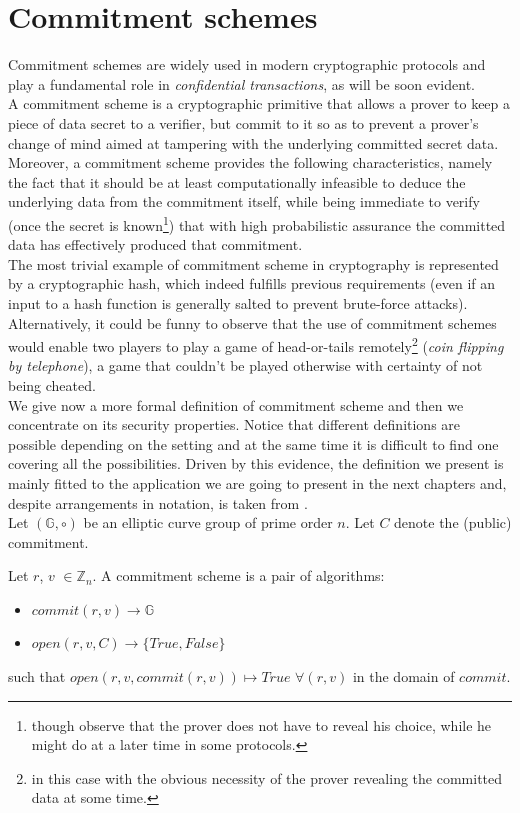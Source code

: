 \section{Commitment schemes}
Commitment schemes are widely used in modern cryptographic protocols and play a fundamental role in \textit{confidential transactions}, as will be soon evident.\\
A commitment scheme is a cryptographic primitive that allows a prover to keep a piece of data secret to a verifier, but commit to it so as to prevent a prover's change of mind aimed at tampering with the underlying committed secret data. Moreover, a commitment scheme provides the following characteristics, namely the fact that it should be at least computationally infeasible to deduce the underlying data from the commitment itself, while being immediate to verify (once the secret is known\footnote{though observe that the prover does not have to reveal his choice, while he might do at a later time in some protocols.}) that with high probabilistic assurance the committed data has effectively produced that commitment.\\
The most trivial example of commitment scheme in cryptography is represented by a cryptographic hash, which indeed fulfills previous requirements (even if an input to a hash function is generally salted to prevent brute-force attacks). Alternatively, it could be funny to observe that the use of commitment schemes would enable two players to play a game of head-or-tails remotely\footnote{in this case with the obvious necessity of the prover revealing the committed data at some time.} (\textit{coin flipping by telephone}), a game that couldn't be played otherwise with certainty of not being cheated.\\
We give now a more formal definition of commitment scheme and then we concentrate on its security properties. Notice that different definitions are possible depending on the setting and at the same time it is difficult to find one covering all the possibilities. Driven by this evidence, the definition we present is mainly fitted to the application we are going to present in the next chapters and, despite arrangements in notation, is taken from \cite{PoeMW}.\\
Let $(\mathbb{G}, \circ)$ be an elliptic curve group of prime order $n$. Let $C$ denote the (public) commitment.
\begin{mydef}
\label{commitement}
    Let $r$, $v$ $\in \mathbb{Z}_n$. A commitment scheme is a pair of algorithms: \begin{itemize}
        \item $commit(r,v) \rightarrow \mathbb{G}$
        \item $open(r,v,C) \rightarrow \{True, False\}$
    \end{itemize}
    such that $open(r,v,commit(r,v)) \mapsto True$ $\forall (r,v)$ in the domain of $commit$.
\end{mydef}

